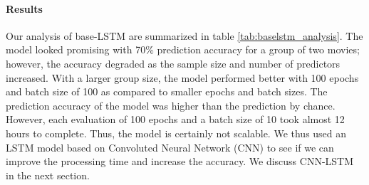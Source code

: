 \paragraph{Results} Our analysis of base-LSTM are summarized in table \ref{tab:baselstm_analysis}. The model looked promising with 70\% prediction accuracy for a group of two movies; however, the accuracy degraded as the sample size and number of predictors increased. With a larger group size, the model performed better with 100 epochs and batch size of 100 as compared to smaller epochs and batch sizes. The prediction accuracy of the model was higher than the prediction by chance. However, each evaluation of 100 epochs and a batch size of 10 took almost 12 hours to complete. Thus, the model is certainly not scalable. We thus used an LSTM model based on Convoluted Neural Network (CNN) to see if we can improve the processing time and increase the accuracy. We discuss CNN-LSTM in the next section.
\begin{center}
\label{tab:baselstm_analysis}
\end{center}

